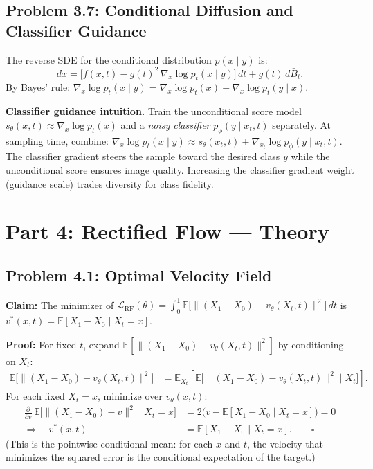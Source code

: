 \documentclass[11pt]{article}
\newcommand{\E}{\mathbb{E}}
\begin{document}
\subsection{Problem 3.7: Conditional Diffusion and Classifier Guidance}

The reverse SDE for the conditional distribution $p(x\mid y)$ is:
\[
dx = \bigl[f(x,t) - g(t)^2\,\nabla_x\log p_t(x\mid y)\bigr]\,dt + g(t)\,d\bar B_t.
\]
By Bayes' rule:
$\nabla_x\log p_t(x\mid y) = \nabla_x\log p_t(x) + \nabla_x\log p_t(y\mid x)$.

\textbf{Classifier guidance intuition.}
Train the unconditional score model $s_\theta(x,t)\approx\nabla_x\log p_t(x)$
and a \emph{noisy classifier} $p_\phi(y\mid x_t,t)$ separately.
At sampling time, combine:
$\nabla_x\log p_t(x\mid y) \approx s_\theta(x_t,t) + \nabla_{x_t}\log p_\phi(y\mid x_t,t)$.
The classifier gradient steers the sample toward the desired class $y$ while the
unconditional score ensures image quality.  Increasing the classifier gradient
weight (guidance scale) trades diversity for class fidelity.

\section{Part 4: Rectified Flow — Theory}

\subsection{Problem 4.1: Optimal Velocity Field}

\textbf{Claim:} The minimizer of
$\mathcal{L}_\mathrm{RF}(\theta) = \int_0^1\E\bigl[\|(X_1-X_0)-v_\theta(X_t,t)\|^2\bigr]\,dt$
is $v^*(x,t) = \E[X_1-X_0\mid X_t=x]$.

\textbf{Proof:} For fixed $t$, expand $\E[\|(X_1-X_0)-v_\theta(X_t,t)\|^2]$ by conditioning on $X_t$:
\begin{align*}
\E\bigl[\|(X_1-X_0)-v_\theta(X_t,t)\|^2\bigr]
&= \E_{X_t}\!\left[\E\bigl[\|(X_1-X_0)-v_\theta(X_t,t)\|^2\;\big|\;X_t\bigr]\right].
\end{align*}
For each fixed $X_t=x$, minimize over $v_\theta(x,t)$:
\begin{align*}
\frac{\partial}{\partial v}\,
\E\bigl[\|(X_1-X_0)-v\|^2\mid X_t=x\bigr]
&= 2\bigl(v - \E[X_1-X_0\mid X_t=x]\bigr) = 0\\
\Longrightarrow\quad v^*(x,t) &= \E[X_1-X_0\mid X_t=x]. \qquad\square
\end{align*}
(This is the pointwise conditional mean: for each $x$ and $t$, the velocity that
minimizes the squared error is the conditional expectation of the target.)
\end{document}
